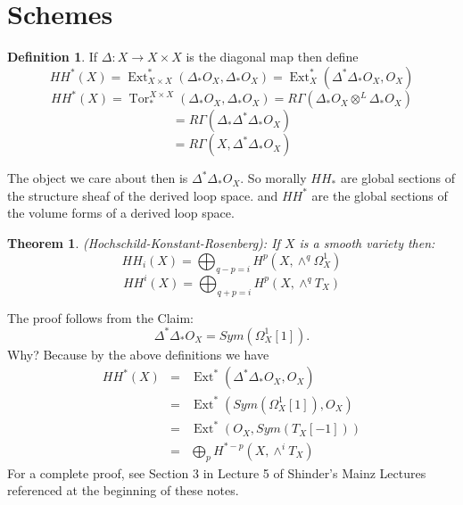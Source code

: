 \documentclass[12pt]{amsart}
\newtheorem{thm}[equation]{Theorem}
\theoremstyle{definition}
\newtheorem{defn}[equation]{Definition}
\newcommand{\Ext}{\operatorname{Ext}} %
\newcommand{\Tor}{\operatorname{Tor}}
\renewcommand{\to}{\longrightarrow}
\begin{document}
\section{Schemes}
\begin{defn}
If $\Delta: X \to X\times X$ is the diagonal map then define
$$HH^*(X) = \Ext^*_{X\times X} (\Delta_* O_X, \Delta_* O_X) = \Ext_X^* (\Delta^*\Delta_* O_X, O_X)$$
$$HH^*(X) = \Tor_*^{X\times X} (\Delta_* O_X, \Delta_* O_X) = R\Gamma (\Delta_*O_X\otimes^L \Delta_*O_X)$$
$$= R\Gamma(\Delta_*\Delta^*\Delta_* O_X)$$
$$= R\Gamma(X,\Delta^*\Delta_* O_X)$$
\end{defn}
The object we care about then is $\Delta^*\Delta_*O_X$.  So morally $HH_*$ are global sections of the structure sheaf of the derived loop space. and $HH^*$ are the global sections of the volume forms of a derived loop space.

\begin{thm}(Hochschild-Konstant-Rosenberg):  If $X$ is a smooth variety then:
$$HH_i(X) = \bigoplus_{q-p = i}  H^p(X, \wedge^q \Omega_X^1)$$
$$HH^i(X) = \bigoplus_{q+p = i}  H^p(X, \wedge^q T_X)$$
\end{thm}
The proof follows from the Claim:
$$\Delta^*\Delta_*O_X = Sym(\Omega^1_X[1]).$$  Why? Because by the above definitions we have
\begin{eqnarray*}
HH^*(X) &= &\Ext^* (\Delta^* \Delta_* O_X, O_X) \\
&=& \Ext^*(Sym(\Omega^1_X[1]), O_X) \\
&=& \Ext^*(O_X,Sym(T_X[-1])) \\
&= & \bigoplus_{p} H^{*-p}(X, \wedge^i T_X)
\end{eqnarray*}
For a complete proof, see Section 3 in Lecture 5 of Shinder's Mainz Lectures referenced at the beginning of these notes. 
\end{document}
